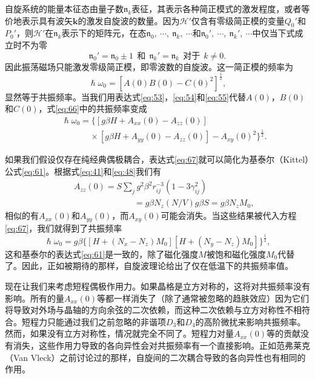 \documentclass{article}
\begin{document}
自旋系统的能量本征态由量子数$\mathfrak{n}_k$表征，其表示各种简正模式的激发程度，或者等价地表示具有波矢$\mathbf{k}$的激发自旋波的数量。因为$\mathcal{H}'$仅含有零级简正模的变量$Q_0'$和$P_0'$，则$\mathcal{H}'$在$\mathfrak{n}_k$表示下的矩阵元，在态$\mathfrak{n}_0,~\cdots,~\mathfrak{n}_k,~\cdots$和$\mathfrak{n}_0',~\cdots,~\mathfrak{n}_k',~\cdots$中仅当下式成立时不为零
\begin{equation} \label{eq:65}
\mathfrak{n}_0'=\mathfrak{n}_0\pm 1~~\text{和}~~\mathfrak{n}_k'=\mathfrak{n}_k~~\text{对于}~~k\neq 0.
\end{equation}
因此振荡磁场只能激发零级简正模，即零波数的自旋波。这一简正模的频率为
\begin{equation} \label{eq:66}
\hslash\omega_0=[A(0)B(0)-C(0)^2]^{\frac{1}{2}},
\end{equation}
显然等于共振频率。当我们用表达式\eqref{eq:53}，\eqref{eq:54}和\eqref{eq:55}代替$A(0)$，$B(0)$和$C(0)$，式\eqref{eq:66}中的共振频率变成
\begin{eqnarray} \label{eq:67}
&&\hslash\omega_0=\{[g\beta H+A_{xx}(0)-A_{zz}(0)]\nonumber\\
&&\phantom{~~~~~~~~~~~~~~~}\times[g\beta H+A_{yy}(0)-A_{zz}(0)]-A_{xy}(0)^2\}^{\frac{1}{2}}.
\end{eqnarray}

如果我们假设仅存在纯经典偶极耦合，表达式\eqref{eq:67}就可以简化为基泰尔（Kittel）公式\eqref{eq:61}。根据式\eqref{eq:41}和\eqref{eq:48}我们有
\begin{eqnarray} \label{eq:68}
&&A_{zz}(0)=S\sum\nolimits_jg^2\beta^2r_{ij}^{-3}(1-3\gamma_{ij}^2)\nonumber\\
&&\phantom{~~~~~~~~~~~~~~~~~~~~~~~~~~~~~~~~}=g\beta N_z(N/V)g\beta S=g\beta N_zM_0,
\end{eqnarray}
相似的有$A_{xx}(0)$和$A_{yy}(0)$，而$A_{xy}(0)$可能会消失。当这些结果被代入方程\eqref{eq:67}，我们就得到了共振频率
\begin{equation} \label{eq:69}
\hslash\omega_0=g\beta\{[H+(N_x-N_z)M_0][H+(N_y-N_z)M_0]\}^{\frac{1}{2}},
\end{equation}
这和基泰尔的表达式\eqref{eq:61}是一致的，除了磁化强度$M$被饱和磁化强度$M_0$代替了。因此，正如被期待的那样，自旋波理论给出了仅在低温下的共振频率值。

现在让我们来考虑短程偶极作用力。如果晶格是立方对称的，这将对共振频率没有影响。所有的量$A_{xx}(0)$等都一样消失了（除了通常被忽略的趋肤效应）因为它们将导致对外场与晶轴的方向余弦的二次依赖，而这种二次依赖与立方对称性不相符合。短程力只能通过我们之前忽略的非谐项$D_3$和$D_4$的高阶微扰来影响共振频率。然而，如果没有立方对称性，情况就完全不同了。短程力对量$A_{xx}(0)$等的贡献没有消失，这些作用力导致的各向异性会对共振频率有一个直接影响。正如范弗莱克（Van Vleck）之前讨论过的那样，自旋间的二次耦合导致的各向异性也有相同的作用。
\end{document}
